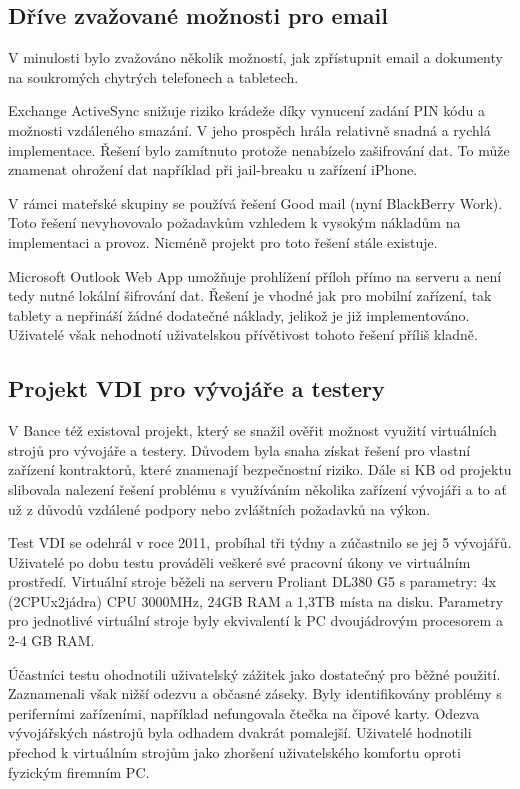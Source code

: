 \subsection{Dříve zvažované možnosti pro email}
V minulosti bylo zvažováno několik možností, jak zpřístupnit email a dokumenty na soukromých chytrých telefonech a tabletech.

Exchange ActiveSync snižuje riziko krádeže díky vynucení zadání PIN kódu a možnosti vzdáleného smazání. V jeho prospěch hrála relativně snadná a rychlá implementace. Řešení bylo zamítnuto protože nenabízelo zašifrování dat. To může znamenat ohrožení dat například při jail-breaku u zařízení iPhone.

V rámci mateřské skupiny se používá řešení Good mail (nyní BlackBerry Work). Toto řešení nevyhovovalo požadavkům vzhledem k vysokým nákladům na implementaci a provoz. Nicméně projekt pro toto řešení stále existuje.

Microsoft Outlook Web App umožňuje prohlížení příloh přímo na serveru a není tedy nutné lokální šifrování dat. Řešení je vhodné jak pro mobilní zařízení, tak tablety a nepřináší žádné dodatečné náklady, jelikož je již implementováno. Uživatelé však nehodnotí uživatelskou přívětivost tohoto řešení příliš kladně.

\subsection{Projekt VDI pro vývojáře a testery}\label{projektVDI}

V Bance též existoval projekt, který se snažil ověřit možnost využití virtuálních strojů pro vývojáře a testery. Důvodem byla snaha získat řešení pro vlastní zařízení kontraktorů, které znamenají bezpečnostní riziko. Dále si KB od projektu slibovala nalezení řešení problému s využíváním několika zařízení vývojáři a to ať už z důvodů vzdálené podpory nebo zvláštních požadavků na výkon.

Test VDI se odehrál v roce 2011, probíhal tři týdny a zúčastnilo se jej 5 vývojářů. Uživatelé po dobu testu prováděli veškeré své pracovní úkony ve virtuálním prostředí. Virtuální stroje běželi na serveru Proliant DL380 G5 s parametry: 4x (2CPUx2jádra) CPU 3000MHz, 24GB RAM a 1,3TB místa na disku. Parametry pro jednotlivé virtuální stroje byly ekvivalentí k PC dvoujádrovým procesorem a 2-4 GB RAM.

Účastníci testu ohodnotili uživatelský zážitek jako dostatečný pro běžné použití. Zaznamenali však nižší odezvu a občasné záseky. Byly identifikovány problémy s periferními zařízeními, například nefungovala čtečka na čipové karty. Odezva vývojářských nástrojů byla odhadem dvakrát pomalejší. Uživatelé hodnotili přechod k virtuálním strojům jako zhoršení uživatelského komfortu oproti fyzickým firemním PC. 

